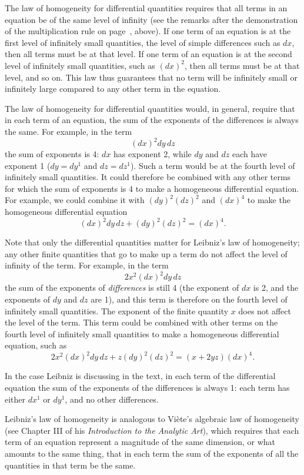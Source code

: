 \documentclass[polutonikogreek,english,twoside,openright]{article}
\begin{document}
The law of homogeneity for differential quantities requires that all
terms in an equation be of the same level of infinity (see the remarks
after the demonstration of the multiplication rule on
page~\pageref{levels}, above).  If one term of an equation is at the
first level of infinitely small quantities, the level of simple
differences such as $dx$, then all terms must be at that level.  If
one term of an equation is at the second level of infinitely small
quantities, such as $(dx)^2$, then all terms must be at that level,
and so on.  This law thus guarantees that no term will be infinitely
small or infinitely large compared to any other term in the equation.

The law of homogeneity for differential quantities would, in general,
require that in each term of an equation, the sum of the exponents of
the differences is always the same.  For example, in the term
$$(dx)^2dy\,dz$$
the sum of exponents is 4: $dx$ has exponent 2, while $dy$ and $dz$
each have exponent 1 ($dy = dy^1$ and $dz = dz^1$).  Such a term would
be at the fourth level of infinitely small quantities.  It could
therefore be combined with any other terms for which the sum of
exponents is 4 to make a homogeneous differential equation.  For
example, we could combine it with $(dy)^2(dz)^2$ and $(dx)^4$ to make
the homogeneous differential equation
$$(dx)^2dy\,dz  + (dy)^2(dz)^2 = (dx)^4.$$

Note that only the differential quantities matter for Leibniz's law of
homogeneity; any other finite quantities that go to make up a term do
not affect the level of infinity of the term.  For example, in the
term
$$2x^2(dx)^2dy\,dz$$
the sum of the exponents of {\em differences} is still 4 (the exponent
of $dx$ is 2, and the exponents of $dy$ and $dz$ are 1), and this term
is therefore on the fourth level of infinitely small quantities.  The
exponent of the finite quantity $x$ does not affect the level of the
term.  This term could be combined with other terms on the fourth
level of infinitely small quantities to make a homogeneous
differential equation, such as
$$2x^2(dx)^2dy\,dz + z(dy)^2(dz)^2 = (x + 2yz)(dx)^4.$$

In the case Leibniz is discussing in the text, in each term of the
differential equation the sum of the exponents of the differences is
always 1: each term has either $dx^1$ or $dy^1$, and no other
differences.

Leibniz's law of homogeneity is analogous to Vi\`{e}te's algebraic law
of homogeneity (see Chapter III of his {\em Introduction to the
  Analytic Art}), which requires that each term of an equation
represent a magnitude of the same dimension, or what amounts to the
same thing, that in each term the sum of the exponents of all the
quantities in that term be the same.
\end{document}
